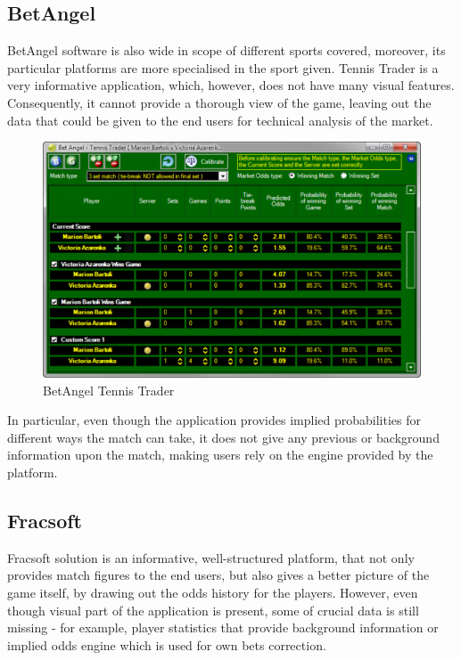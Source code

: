\documentclass[10pt]{report}
\begin{document}
\subsection{BetAngel}

BetAngel software is also wide in scope of different sports covered, moreover, its particular platforms are more specialised 
in the sport given. Tennis Trader is a very informative application, which, however, does not have many visual features. 
Consequently, it cannot provide a thorough view of the game, leaving out the data that could be given to the end users for 
technical analysis of the market.

\begin{figure}[h]
\begin{center}
\includegraphics[scale = 0.36]{betangel.png}
\end{center}
\caption{BetAngel Tennis Trader}
\end{figure}

In particular, even though the application provides implied probabilities for different ways the match can take, it does not give 
any previous or background information upon the match, making users rely on the engine provided by the platform. 

\subsection{Fracsoft}

Fracsoft solution is an informative, well-structured platform, that not only provides match figures to the end users, but also gives a better 
picture of the game itself, by drawing out the odds history for the players. However, even though visual part of the application is 
present, some of crucial data is still missing - for example, player statistics that provide background information or implied odds 
engine which is used for own bets correction.
\end{document}

